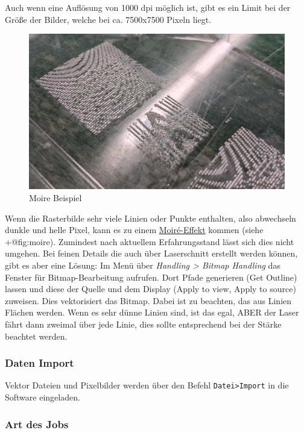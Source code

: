 \documentclass[]{article}
\begin{document}
Auch wenn eine Auflösung von 1000 dpi möglich ist, gibt es ein Limit bei
der Größe der Bilder, welche bei ca. 7500x7500 Pixeln liegt.

\begin{figure}
\hypertarget{fig:moire}{%
\centering
\includegraphics{./assets/images/moire.jpg}
\caption{Moire Beispiel}\label{fig:moire}
}
\end{figure}

Wenn die Rasterbilde sehr viele Linien oder Punkte enthalten, also
abwechseln dunkle und helle Pixel, kann es zu einem
\href{https://de.wikipedia.org/wiki/Moir\%C3\%A9-Effekt}{Moiré-Effekt}
kommen (siehe +@fig:moire). Zumindest nach aktuellem Erfahrungsstand
lässt sich dies nicht umgehen. Bei feinen Details die auch über
Laserschnitt erstellt werden können, gibt es aber eine Lösung: Im Menü
über \emph{Handling \textgreater{} Bitmap Handling} das Fenster für
Bitmap-Bearbeitung aufrufen. Dort Pfade generieren (Get Outline) lassen
und diese der Quelle und dem Display (Apply to view, Apply to source)
zuweisen. Dies vektorisiert das Bitmap. Dabei ist zu beachten, das aus
Linien Flächen werden. Wenn es sehr dünne Linien sind, ist das egal,
ABER der Laser fährt dann zweimal über jede Linie, dies sollte
entsprechend bei der Stärke beachtet werden.

\hypertarget{daten-import}{%
\subsubsection{Daten Import}\label{daten-import}}

Vektor Dateien und Pixelbilder werden über den Befehl
\texttt{Datei\textgreater{}Import} in die Software eingeladen.

\hypertarget{art-des-jobs}{%
\subsubsection{Art des Jobs}\label{art-des-jobs}}
\end{document}
